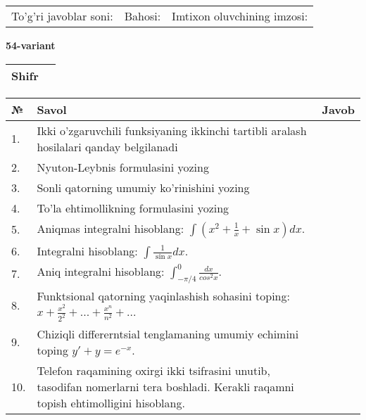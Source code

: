 \documentclass{article}
\begin{document}
  \vspace{1cm}
  
  \begin{tabular}{lll}
  To'g'ri javoblar soni: \underline{\hspace{1.5cm}} & 
  Bahosi: \underline{\hspace{1.5cm}} & 
  Imtixon oluvchining imzosi: \underline{\hspace{2cm}} \\
  \end{tabular}
  
  \egroup
  
  \newpage
  
  
  \textbf{54-variant}\\
  
  \bgroup
  \def\arraystretch{1.6} %
  
  \begin{tabular}{|m{5.7cm}|m{9.5cm}|}
  \hline
  Shifr & \\
  \hline
  \end{tabular}
  
  \vspace{1cm}
  
  \begin{tabular}{|m{0.7cm}|m{10cm}|m{4cm}|}
  \hline
  № & Savol & Javob \\
  \hline
  1. & Ikki o'zgaruvchili funksiyaning ikkinchi tartibli aralash hosilalari qanday belgilanadi &  \\
  \hline
  2. & Nyuton-Leybnis formulasini yozing &  \\
  \hline
  3. & Sonli qatorning umumiy ko'rinishini yozing &  \\
  \hline
  4. & To'la ehtimollikning formulasini yozing &  \\
  \hline
  5. & Aniqmas integralni hisoblang: \(\int {\left( x^{2} + \frac{1}{x} + \sin x \right)dx}\). &  \\
  \hline
  6. & Integralni hisoblang: \(\int {\frac{1}{\sin x}dx}\). &  \\
  \hline
  7. & Aniq integralni hisoblang: \(\int_{- \pi/4}^{0}\frac{dx}{cos^{2}x}\). &  \\
  \hline
  8. & Funktsional qatorning yaqinlashish sohasini toping: \(x + \frac{x^{2}}{2^{2}} + ... + \frac{x^{n}}{n^{2}} + ...\) &  \\
  \hline
  9. & Chiziqli differerntsial tenglamaning umumiy echimini toping \(y' + y = e^{- x}\). &  \\
  \hline
  10. & Telefon raqamining oxirgi ikki tsifrasini unutib, tasodifan nomerlarni tera boshladi. Kerakli raqamni topish ehtimolligini hisoblang. &  \\
  \hline
  \end{tabular}
  
\end{document}
